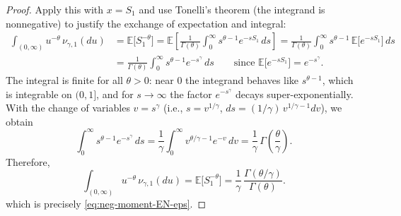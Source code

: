 \documentclass[preprint]{imsart}
\newcommand{\1}{\mathbf{1}}
\theoremstyle{plain}
\theoremstyle{definition}
\begin{document}
\begin{proof}
Apply this with \(x=S_1\) and use Tonelli’s theorem (the integrand is nonnegative) to justify the exchange of expectation and integral:
\begin{align*}
\int_{(0,\infty)} u^{-\theta}\,\nu_{\gamma,1}(du)&=\mathbb{E}\big[S_1^{-\theta}\big]
=\mathbb{E}\!\left[\frac{1}{\Gamma(\theta)}\int_{0}^{\infty} s^{\theta-1} e^{-s S_1}\,ds\right]
=\frac{1}{\Gamma(\theta)}\int_{0}^{\infty} s^{\theta-1}\,\mathbb{E}\big[e^{-s S_1}\big]\,ds\\
&=\frac{1}{\Gamma(\theta)}\int_{0}^{\infty} s^{\theta-1} e^{-s^\gamma}\,ds
\qquad\text{since }\mathbb{E}\big[e^{-s S_1}\big]=e^{-s^\gamma}.
\end{align*}
The integral is finite for all \(\theta>0\): near \(0\) the integrand behaves like \(s^{\theta-1}\), which is integrable on \((0,1]\), and for \(s\to\infty\) the factor \(e^{-s^\gamma}\) decays super-exponentially. 
With the change of variables \(v=s^\gamma\) (i.e., \(s=v^{1/\gamma}\), \(ds=(1/\gamma)\,v^{1/\gamma-1}dv\)), we obtain
\[
\int_{0}^{\infty} s^{\theta-1} e^{-s^\gamma}\,ds
=\frac{1}{\gamma}\int_{0}^{\infty} v^{\theta/\gamma-1} e^{-v}\,dv
=\frac{1}{\gamma}\,\Gamma\!\left(\frac{\theta}{\gamma}\right).
\]
Therefore,
\[
\int_{(0,\infty)} u^{-\theta}\,\nu_{\gamma,1}(du)=\mathbb{E}\big[S_1^{-\theta}\big]
=\frac{1}{\gamma}\,\frac{\Gamma(\theta/\gamma)}{\Gamma(\theta)}.
\]
which is precisely \eqref{eq:neg-moment-EN-eps}. 

\end{proof}
\end{document}
